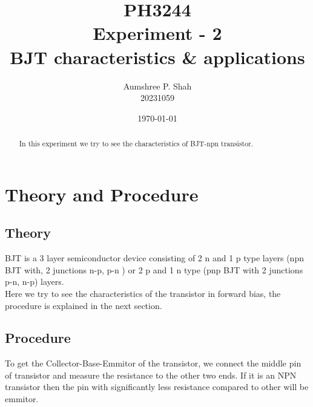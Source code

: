 \documentclass[%
sor,
 jor,
 amsmath,amssymb,
 reprint,
]{revtex4-2}
\begin{document}
\title{PH3244\\Experiment - 2\\BJT characteristics \& applications}
\author{Aumshree P. Shah\\20231059}
\date{\today}
\begin{abstract}
\centering
In this experiment we try to see the characteristics of BJT-npn transistor. 
\end{abstract}
\maketitle
\tableofcontents
\vspace*{\fill}
\pagebreak
\section{Theory and Procedure}
\subsection{Theory}
BJT is a 3 layer semiconductor device consisting of 2 n and 1 p type layers (npn BJT with, 2  junctions n-p, p-n  ) or 2 p and 1 n type (pnp BJT  with 2 junctions p-n, n-p) layers.\\
Here we try to see the characteristics of the transistor in forward bias, the procedure is explained in the next section.
\subsection{Procedure}
To get the Collector-Base-Emmitor of the transistor, we connect the middle pin of transistor and measure the resistance to the other two ends. If it is an NPN transistor then the pin with significantly less resistance compared to other will be emmitor.
\end{document}

